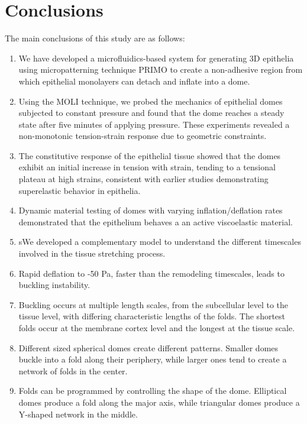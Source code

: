 
\hypertarget{conclusions}{%
	\section{Conclusions}\label{conclusions}}

The main conclusions of this study are as follows:

\begin{enumerate}
	\def\labelenumi{\arabic{enumi}.}
	\item We have developed a microfluidics-based system for generating 3D epithelia using micropatterning technique PRIMO to create a non-adhesive region from which epithelial monolayers can detach and inflate into a dome.
	\item Using the MOLI technique, we probed the mechanics of epithelial domes subjected to constant pressure and found that the dome reaches a steady state after five minutes of applying pressure. These experiments revealed a non-monotonic tension-strain response due to geometric constraints.
	\item The constitutive response of the epithelial tissue showed that the domes exhibit an initial increase in tension with strain, tending to a tensional plateau at high strains, consistent with earlier studies demonstrating superelastic behavior in epithelia.
	\item Dynamic material testing of domes with varying inflation/deflation rates demonstrated that the epithelium behaves a an active viscoelastic material.
	\item sWe developed a complementary model to understand the different timescales involved in the tissue stretching process.
	\item Rapid deflation to -50 Pa, faster than the remodeling timescales, leads to buckling instability.
	\item Buckling occurs at multiple length scales, from the subcellular level to the tissue level, with differing characteristic lengths of the folds. The shortest folds occur at the membrane cortex level and the longest at the tissue scale.
	\item Different sized spherical domes create different patterns. Smaller domes buckle into a fold along their periphery, while larger ones tend to create a network of folds in the center.
	\item Folds can be programmed by controlling the shape of the dome. Elliptical domes produce a fold along the major axis, while triangular domes produce a Y-shaped network in the middle.
\end{enumerate}

